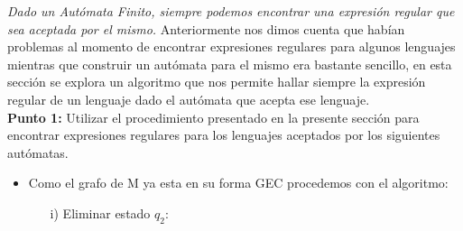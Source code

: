 
\textit{Dado un Autómata Finito, siempre podemos encontrar una expresión regular que sea aceptada por el mismo.} Anteriormente nos dimos cuenta que habían problemas al momento de encontrar expresiones regulares para algunos lenguajes mientras que construir un autómata para el mismo era bastante sencillo, en esta sección se explora un algoritmo que nos permite hallar siempre la expresión regular de un lenguaje dado el autómata que acepta ese lenguaje.\\

\textbf{Punto 1: }Utilizar el procedimiento presentado en la presente sección para encontrar expresiones regulares para los lenguajes aceptados por los siguientes autómatas.
\begin{itemize}[label={$\bullet$}]
    \item \hfill 
        \begin{center}
            \end{center} 
    Como el grafo de M ya esta en su forma GEC procedemos con el algoritmo:
    \begin{itemize}
        \item[i)] Eliminar estado $q_2$:
        \begin{basedtikz}
        \centering
\end{basedtikz}
\end{itemize}
\end{itemize}
